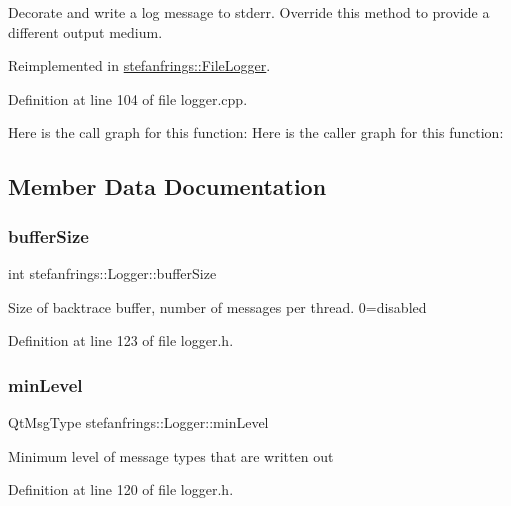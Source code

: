 Decorate and write a log message to stderr. Override this method to provide a different output medium. 

Reimplemented in \mbox{\hyperlink{classstefanfrings_1_1_file_logger_a9258a5e72c22a6b14e25af8eae2092c1}{stefanfrings\+::\+File\+Logger}}.



Definition at line 104 of file logger.\+cpp.

Here is the call graph for this function\+:
Here is the caller graph for this function\+:


\subsection{Member Data Documentation}
\mbox{\label{classstefanfrings_1_1_logger_a9e6f76da976e3f09962c7613ad7aad8a}} 
\subsubsection{\texorpdfstring{buffer\+Size}{bufferSize}}
{\footnotesize\ttfamily int stefanfrings\+::\+Logger\+::buffer\+Size\hspace{0.3cm}{\ttfamily [protected]}}

Size of backtrace buffer, number of messages per thread. 0=disabled 

Definition at line 123 of file logger.\+h.

\mbox{\label{classstefanfrings_1_1_logger_a032b8dabe616327d58e97b1a5c853f86}} 
\subsubsection{\texorpdfstring{min\+Level}{minLevel}}
{\footnotesize\ttfamily Qt\+Msg\+Type stefanfrings\+::\+Logger\+::min\+Level\hspace{0.3cm}{\ttfamily [protected]}}

Minimum level of message types that are written out 

Definition at line 120 of file logger.\+h.

